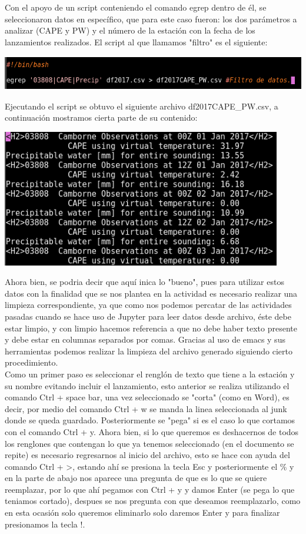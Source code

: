 \documentclass[12pt]{article}
\begin{document}
Con el apoyo de un script conteniendo el comando egrep dentro de él, se seleccionaron datos en específico, que para este caso fueron: los dos parámetros a analizar (CAPE y PW) y el número de la estación con la fecha de los lanzamientos realizados. El script al que llamamos "filtro" es el siguiente:
\begin{center}
	\includegraphics[height=1.5cm]{script.png}
\end{center}
Ejecutando el script se obtuvo el siguiente archivo df2017CAPE\_PW.csv, a continuación mostramos cierta parte de su contenido:
\begin{center}
	\includegraphics[height=6cm]{datoscompletos.png}
\end{center}
Ahora bien, se podria decir que aquí inica lo "bueno", pues para utilizar estos datos con la finalidad que se nos plantea en la actividad es necesario realizar una limpieza correspondiente, ya que como nos podemos percatar de las actividades pasadas cuando se hace uso de Jupyter para leer datos desde archivo, éste debe estar limpio, y con limpio hacemos referencia a que no debe haber texto presente y debe estar en columnas separados por comas. Gracias al uso de emacs y sus herramientas podemos realizar la limpieza del archivo generado siguiendo cierto procedimiento.\\

Como un primer paso es seleccionar el renglón de texto que tiene a la estación y su nombre evitando incluir el lanzamiento, esto anterior se realiza utilizando el comando Ctrl + space bar, una vez seleccionado se "corta" (como en Word), es decir, por medio del comando Ctrl + w se manda la linea seleccionada al junk donde se queda guardado. Posteriormente se "pega" si es el caso lo que cortamos con el comando Ctrl + y. Ahora bien, si lo que queremos es deshacernos de todos los renglones que contengan lo que ya tenemos seleccionado (en el documento se repite) es necesario regresarnos al inicio del archivo, esto se hace con ayuda del comando Ctrl + >, estando ahí se presiona la tecla Esc y posteriormente el \% y en la parte de abajo nos aparece una pregunta de que es lo que se quiere reemplazar, por lo que ahí pegamos con Ctrl + y y damos Enter (se pega lo que teniamos cortado), despues se nos pregunta con que deseamos reemplazarlo, como en esta ocasión solo queremos eliminarlo solo daremos Enter y para finalizar presionamos la tecla !. \\
\end{document}
